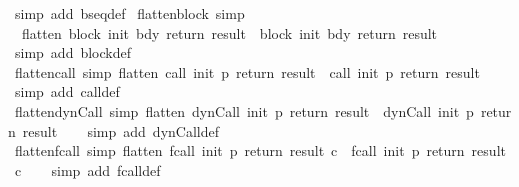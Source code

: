 \begin{isabellebody}
\ {\isacharparenleft}simp\ add{\isacharcolon}\ bseq{\isacharunderscore}def{\isacharparenright}%
\endisatagproof
{\isafoldproof}%
%
\isadelimproof
\isanewline
%
\endisadelimproof
\isanewline
{}\isamarkupfalse%
\ flatten{\isacharunderscore}block\ {\isacharbrackleft}simp{\isacharbrackright}{\isacharcolon}\isanewline
\ \ {\isachardoublequoteopen}flatten\ {\isacharparenleft}block\ init\ bdy\ return\ result{\isacharparenright}\ {\isacharequal}\ {\isacharbrackleft}block\ init\ bdy\ return\ result{\isacharbrackright}{\isachardoublequoteclose}\isanewline
%
\isadelimproof
\ \ %
\endisadelimproof
%
\isatagproof
{}\isamarkupfalse%
\ {\isacharparenleft}simp\ add{\isacharcolon}\ block{\isacharunderscore}def{\isacharparenright}%
\endisatagproof
{\isafoldproof}%
%
\isadelimproof
\isanewline
%
\endisadelimproof
\isanewline
{}\isamarkupfalse%
\ flatten{\isacharunderscore}call\ {\isacharbrackleft}simp{\isacharbrackright}{\isacharcolon}\ {\isachardoublequoteopen}flatten\ {\isacharparenleft}call\ init\ p\ return\ result{\isacharparenright}\ {\isacharequal}\ {\isacharbrackleft}call\ init\ p\ return\ result{\isacharbrackright}{\isachardoublequoteclose}\isanewline
%
\isadelimproof
\ \ %
\endisadelimproof
%
\isatagproof
{}\isamarkupfalse%
\ {\isacharparenleft}simp\ add{\isacharcolon}\ call{\isacharunderscore}def{\isacharparenright}%
\endisatagproof
{\isafoldproof}%
%
\isadelimproof
\isanewline
%
\endisadelimproof
\isanewline
{}\isamarkupfalse%
\ flatten{\isacharunderscore}dynCall\ {\isacharbrackleft}simp{\isacharbrackright}{\isacharcolon}\ {\isachardoublequoteopen}flatten\ {\isacharparenleft}dynCall\ init\ p\ return\ result{\isacharparenright}\ {\isacharequal}\ {\isacharbrackleft}dynCall\ init\ p\ return\ result{\isacharbrackright}{\isachardoublequoteclose}\isanewline
%
\isadelimproof
\ \ %
\endisadelimproof
%
\isatagproof
{}\isamarkupfalse%
\ {\isacharparenleft}simp\ add{\isacharcolon}\ dynCall{\isacharunderscore}def{\isacharparenright}%
\endisatagproof
{\isafoldproof}%
%
\isadelimproof
\isanewline
%
\endisadelimproof
\isanewline
{}\isamarkupfalse%
\ flatten{\isacharunderscore}fcall\ {\isacharbrackleft}simp{\isacharbrackright}{\isacharcolon}\ {\isachardoublequoteopen}flatten\ {\isacharparenleft}fcall\ init\ p\ return\ result\ c{\isacharparenright}\ {\isacharequal}\ {\isacharbrackleft}fcall\ init\ p\ return\ result\ c{\isacharbrackright}{\isachardoublequoteclose}\isanewline
%
\isadelimproof
\ \ %
\endisadelimproof
%
\isatagproof
{}\isamarkupfalse%
\ {\isacharparenleft}simp\ add{\isacharcolon}\ fcall{\isacharunderscore}def{\isacharparenright}%

\end{isabellebody}
